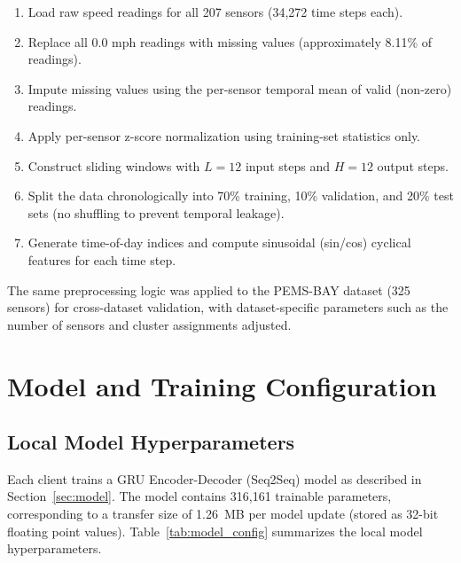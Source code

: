 \begin{enumerate}
    \item Load raw speed readings for all 207 sensors (34,272 time steps each).
    \item Replace all $0.0$ mph readings with missing values (approximately 8.11\% of readings).
    \item Impute missing values using the per-sensor temporal mean of valid (non-zero) readings.
    \item Apply per-sensor z-score normalization using training-set statistics only.
    \item Construct sliding windows with $L=12$ input steps and $H=12$ output steps.
    \item Split the data chronologically into 70\% training, 10\% validation, and 20\% test sets (no shuffling to prevent temporal leakage).
    \item Generate time-of-day indices and compute sinusoidal (sin/cos) cyclical features for each time step.
\end{enumerate}

The same preprocessing logic was applied to the PEMS-BAY dataset (325 sensors) for cross-dataset validation, with dataset-specific parameters such as the number of sensors and cluster assignments adjusted.

\section{Model and Training Configuration}
\label{sec:config}

\subsection{Local Model Hyperparameters}

Each client trains a GRU Encoder-Decoder (Seq2Seq) model as described in Section~\ref{sec:model}. The model contains 316,161 trainable parameters, corresponding to a transfer size of 1.26~MB per model update (stored as 32-bit floating point values). Table~\ref{tab:model_config} summarizes the local model hyperparameters.

